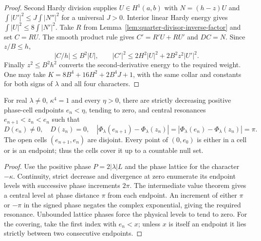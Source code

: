 \begin{proof}
\leanok
Second Hardy division supplies $U\in H^1(a,b)$ with $N=(h-z)U$ and
$\int|U'|^2\le J\int|N''|^2$ for a universal $J>0$.
Interior linear Hardy energy gives $\int|U|^2\le8\int|N'|^2$.
Take $R$ from Lemma~\ref{lem:quarter-divisor-inverse-factor} and set
$C=RU$. The smooth product rule gives $C'=R'U+RU'$ and $DC=N$.
Since $z/B\le h$,
\[
 |C/h|\le B^2|U|,\qquad
 |C'|^2\le2H^2|U|^2+2B^2z^2|U'|^2 .
\]
Finally $z^2\le B^2h^2$ converts the second-derivative energy to
the required weight. One may take
$K=8B^4+16H^2+2B^4J+1$, with the same collar and constants for
both signs of $\lambda$ and all four characters.

\end{proof}

\begin{lemma}
\label{lem:complete-phase-cells}
\leanok
For real $\lambda\ne0$, $\kappa^4=1$ and every $\eta>0$, there are
strictly decreasing positive phase-cell endpoints $e_n<\eta$, tending
to zero, and central resonances $e_{n+1}<z_n<e_n$ such that
\[
 D(e_n)\ne0,\quad D(z_n)=0,\quad
 |\Phi_\lambda(e_{n+1})-\Phi_\lambda(z_n)|
 =|\Phi_\lambda(e_n)-\Phi_\lambda(z_n)|=\pi.
\]
The open cells $(e_{n+1},e_n)$ are disjoint. Every point of $(0,e_0)$
is either in a cell or is an endpoint; thus the cells cover it
up to a countable null set.
\end{lemma}

\begin{proof}
\leanok
Use the positive phase $P=2|\lambda|L$ and the phase lattice for
the character $-\kappa$. Continuity, strict decrease and divergence at
zero enumerate its endpoint levels with successive phase increments $2\pi$.
The intermediate value theorem gives a central level at phase distance
$\pi$ from each endpoint. An increment of either $\pi$ or $-\pi$ in the
signed phase negates the complex exponential, giving the required resonance.
Unbounded lattice phases force the physical levels to tend to zero.
For the covering, take the first index with $e_n<x$; unless $x$ is itself
an endpoint it lies strictly between two consecutive endpoints.
\end{proof}

